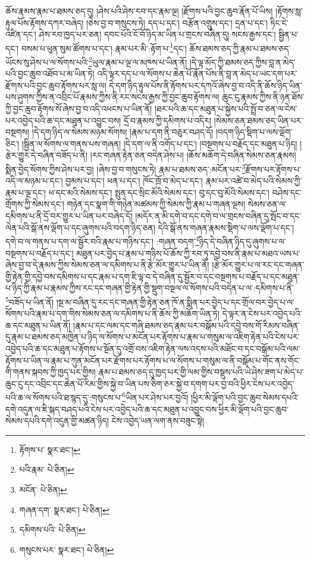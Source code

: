 ཆོས་རྣམས་རྣམ་པ་ཐམས་ཅད་དུ། །ཤེས་པའི་ཤེས་རབ་དང་རྣམ་ལྔ། །རྫོགས་པའི་བྱང་ཆུབ་རྣོན་པོ་ཡིས། །རྟོགས་སླ་རྟུལ་པོས་རྟོགས་དཀར་བཞེད། །ཅེས་བྱ་བ་གསུངས་ཏེ། དད་པ་དང་། བརྩོན་འགྲུས་དང་། དྲན་པ་དང་། ཏིང་ངེ་འཛིན་དང་། ཤེས་རབ་ཁྱད་པར་ཅན། དབང་པོའི་ངོ་བོ་ཉིད་མ་ཡིན་པ་གྲངས་བཞིན་དུ། སངས་རྒྱས་དང་། སྦྱིན་པ་དང་། བསམ་པ་ཕུན་སུམ་ཚོགས་པ་དང་། རྣམ་པར་མི་:རྟོག་པ་\footnote{རྟོགས་པ་  སྣར་ཐང་། }དང་། ཆོས་ཐམས་ཅད་ཀྱི་རྣམ་པ་ཐམས་ཅད་ཡོངས་སུ་ཤེས་པ་ལ་སོགས་པའི་\footnote{པའི་རྣམ་  པེ་ཅིན། }ཡུལ་རྣམ་པ་ལྔ་ལ་མཁས་པ་ཡིན་ནོ། །དེ་ལྟ་མོད་ཀྱི་ཐམས་ཅད་ཀྱིས་བླ་ན་མེད་པའི་བྱང་ཆུབ་འཐོབ་པ་མ་ཡིན་ཏེ། འདི་ལྟར་དད་པ་ལ་སོགས་པ་ཆེན་པོ་རྣོན་པོས་ནི་བླ་ན་མེད་པ་ཡང་དག་པར་རྫོགས་པའི་བྱང་ཆུབ་རྟོགས་པར་སླ་ལ། དེ་དག་ཉིད་རྟུལ་པོས་ནི་རྟོགས་པར་དཀའོ་ཞེས་བྱ་བ་འདི་ནི་ཆོས་ཉིད་ཡིན་པས་ཤུགས་ཀྱིས་ན་འབྲིང་པོ་རྣམས་ཀྱིས་ནི་རང་སངས་རྒྱས་ཀྱི་བྱང་ཆུབ་རྟོགས་ལ། ཆུང་ངུ་རྣམས་ཀྱིས་ནི་ཉན་ཐོས་ཀྱི་བྱང་ཆུབ་རྟོགས་སོ་ཞེས་བྱ་བ་འདི་འཕངས་པ་ཡིན་ནོ། །ཐར་པའི་ཆ་དང་མཐུན་པ་སྐྱེས་པའི་སྤྲོ་བ་ཅན་ལ་ངེས་པར་འབྱེད་པའི་ཆ་དང་མཐུན་པ་འབྱུང་བས། དྲོ་བ་རྣམས་ཀྱི་དམིགས་པ་འདིར། །སེམས་ཅན་ཐམས་ཅད་ཡིན་པར་བསྔགས། །དེ་དག་ཉིད་ལ་སེམས་མཉམ་སོགས། །རྣམ་པ་དག་ནི་བཅུར་བཤད་དོ། །བདག་ཉིད་སྡིག་པ་ལས་ལྡོག་ཅིང་། །སྦྱིན་ལ་སོགས་ལ་གནས་པས་གཞན། །དེ་དག་ལ་ནི་འགོད་པ་དང་། །བསྔགས་པ་བརྗོད་དང་མཐུན་པ་ཉིད། །རྩེར་གྱུར་དེ་བཞིན་བཟོད་པ་ནི། །རང་གཞན་རྟེན་ཅན་བདེན་ཤེས་པ། །ཆོས་མཆོག་དེ་བཞིན་སེམས་ཅན་རྣམས། སྨིན་བྱེད་སོགས་ཀྱིས་ཤེས་པར་བྱ། །ཞེས་བྱ་བ་གསུངས་ཏེ། རྣམ་པ་ཐམས་ཅད་:མངོན་པར་\footnote{མངོན་  པེ་ཅིན། }རྫོགས་པར་རྟོགས་པ་འདི་ལ་མཉམ་པ་དང་། བྱམས་པ་དང་། ཕན་པ་དང་། ཁོང་ཁྲོ་བ་མེད་པ་དང་། རྣམ་པར་འཚེ་བ་མེད་པའི་སེམས་ཀྱི་རྣམ་པ་ལྔ་དང་། ཕ་དང་མའི་སེམས་དང་། སྤུན་དང་སྲིང་མོའི་སེམས་དང་། བུ་དང་བུ་མོའི་སེམས་དང་། བཤེས་དང་གྲོགས་ཀྱི་སེམས་དང་། གཉེན་དང་སྣག་གི་གཉེན་མཚམས་ཀྱི་སེམས་ཀྱི་རྣམ་པ་གཞན་ལྔས། སེམས་ཅན་ལ་དམིགས་པ་ནི་དྲོ་བར་གྱུར་པ་ཡིན་པར་བཞེད་དོ། །མདོར་ན་མི་དགེ་བ་དང་དགེ་བ་ལ་གྲངས་བཞིན་དུ་སྤོང་བ་དང་ལེན་པའི་སྒོ་ནས་ལྡོག་པ་དང་ཞུགས་པའི་བདག་ཉིད་ཅན། དེའི་སྒོ་ནས་གཞན་རྣམས་སྡིག་པ་ལས་ལྡོག་པ་དང་། དགེ་བ་ལ་གནས་པ་དག་ལ་སྦྱོར་བའི་རྣམ་པ་གཉིས་དང་། :གཞན་བདག་\footnote{གཞན་དག་  སྣར་ཐང་།  པེ་ཅིན། }ཉིད་དེ་བཞིན་ཉིད་དུ་ཞུགས་པ་ལ་བསྔགས་པ་བརྗོད་པ་དང་། མཐུན་པར་བྱེད་པ་རྣམ་པ་གཉིས་པོ་ཆོས་ཀྱི་རབ་ཏུ་དབྱེ་བས་ནི་རྣམ་པ་མཐའ་ཡས་པ་ཞེས་བྱ་བ་དེ་རྣམས་ཀྱིས་སེམས་ཅན་ལ་དམིགས་པ་ནི་རྩེ་མོར་གྱུར་པ་ཡིན་ནོ། །རྩེ་མོར་གྱུར་པ་ལ་རང་དང་གཞན་གྱི་རྟེན་གྱི་དབྱེ་བས་དམིགས་པ་དང་རྣམ་པ་དག་ཇི་ལྟ་བ་དེ་བཞིན་དུ་སྦྱོར་བ་དང་བསྔགས་པ་བརྗོད་པ་དང་མཐུན་པ་ཉིད་ཀྱི་རྣམ་པ་རྣམས་ཀྱིས་རང་དང་གཞན་གྱི་རྟེན་གྱི་སྡུག་བསྔལ་ལ་སོགས་པའི་བདེན་པ་ལ་:དམིགས་པ་ནི་\footnote{དམིགས་པའི་  པེ་ཅིན། }བཟོད་པ་ཡིན་ནོ། །སྔ་མ་བཞིན་དུ་རང་དང་གཞན་གྱི་རྟེན་ཅན་ཁོ་ན་སྨིན་པར་བྱེད་པ་དང་གྲོལ་བར་བྱེད་པ་ལ་སོགས་པའི་རྣམ་པ་དག་གིས་སེམས་ཅན་ལ་དམིགས་པ་ནི་ཆོས་ཀྱི་མཆོག་ཡིན་ཏེ། དེ་ལྟར་ན་ངེས་པར་འབྱེད་པའི་ཆ་དང་མཐུན་པ་ཡིན་ནོ། །རྣམ་པ་དང་ལམ་དང་གཞི་ཐམས་ཅད་རྣམ་པར་བསྒོམ་པའི་དབྱེ་བས་གོ་རིམས་བཞིན་དུ་རྣམ་པ་ཐམས་ཅད་མཁྱེན་པ་ཉིད་ལ་སོགས་པ་མངོན་པར་རྟོགས་པ་རྣམ་པ་གསུམ་ལ་འཇིག་རྟེན་པའི་ངེས་པར་འབྱེད་པའི་ཆ་དང་མཐུན་པ་རྟོགས་པ་སྔོན་དུ་འགྲོ་བས་འཇིག་རྟེན་ལས་འདས་པའི་མཐོང་བ་དང་བསྒོམ་པའི་ལམ་རྟོགས་པ་ཡིན་ལ་རྣམ་པ་ཀུན་མངོན་པར་རྫོགས་པར་རྟོགས་པ་ལ་སོགས་པ་གསུམ་ལ་ནི་བསྒོམ་པ་གོང་ནས་གོང་གི་གནས་སྐབས་ཀྱི་ཁྱད་པར་གྱིས། རྣམ་པ་ཐམས་ཅད་དུ་ཁྱད་པར་གྱི་ལམ་གྱིས་བསྡུས་པའི་ཡེ་ཤེས་ཟག་པ་མེད་པ་ཆུང་ངུ་དང་འབྲིང་དང་ཆེན་པོ་རིམ་གྱིས་སྐྱེ་བ་ཡིན་པས་ཅིག་ཅར་སྐྱེ་བ་དགག་པར་བྱ་བའི་ཕྱིར་ངེས་པར་འབྱེད་པའི་ཆ་ལ་སོགས་པའི་ཐ་སྙད་དུ་:གསུངས་པ་\footnote{གསུངས་པར་  སྣར་ཐང་།  པེ་ཅིན། }ཡིན་པར་ཤེས་པར་བྱའོ། །ཕྱིར་མི་ལྡོག་པའི་བྱང་ཆུབ་སེམས་དཔའི་དགེ་འདུན་ལ་ཇི་སྐད་བཤད་པའི་ངེས་པར་འབྱེད་པའི་ཆ་དང་མཐུན་པ་འབྱུང་བས་ཕྱིར་མི་ལྡོག་པའི་བྱང་ཆུབ་སེམས་དཔའི་དགེ་འདུན་གྱི་མཚན་ཉིད། ངེས་འབྱེད་ཡན་ལག་ནས་བཟུང་སྟེ། 